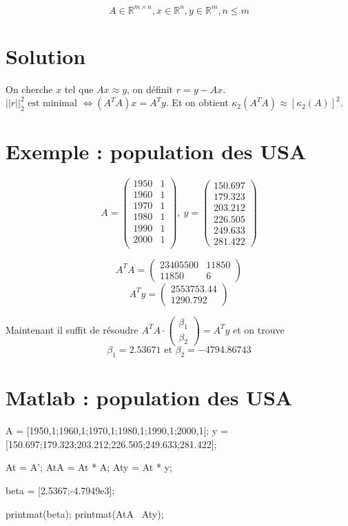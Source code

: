\documentclass[a4paper,9pt]{extarticle}
\newcommand{\matdd}[2]{\begin{pmatrix}#1 \\ #2\end{pmatrix}}
\begin{document}
$$
A \in \mathbb{R}^{m\times n}, x \in \mathbb{R}^n, y \in \mathbb{R}^m, n \leq m
$$

\section{Solution}

On cherche $x$ tel que $Ax \approx y$, on définit $r = y - Ax$. $||r||^2_2 \text{ est minimal } \Longleftrightarrow (A^T A)x = A^T y$. Et on obtient $\kappa_2(A^T A) \approx [\kappa_2(A)]^2$.

\section{Exemple : population des USA}

$$
A = \begin{pmatrix}
1950 & 1 \\
1960 & 1 \\
1970 & 1 \\
1980 & 1 \\
1990 & 1 \\
2000 & 1 \\
\end{pmatrix}, \ 
y = \begin{pmatrix}
150.697 \\
179.323 \\
203.212 \\
226.505 \\
249.633 \\
281.422
\end{pmatrix}
$$

$$
A^T A = \begin{pmatrix}
23405500 & 11850 \\
11850 & 6
\end{pmatrix}
$$
$$
A^T y = \begin{pmatrix}
2553753.44 \\
1290.792
\end{pmatrix}
$$

Maintenant il suffit de résoudre $A^T A \cdot \matdd{\beta_1}{\beta_2} = A^T y$ et on trouve $$\beta_1 = 2.53671 \text{ et } \beta_2 = -4794.86743$$

\section{Matlab : population des USA}
\begin{matlabcode}
A = [1950,1;1960,1;1970,1;1980,1;1990,1;2000,1];
y = [150.697;179.323;203.212;226.505;249.633;281.422];

At = A';
AtA = At * A;
Aty = At * y;

beta = [2.5367;-4.7949e3];

printmat(beta);
printmat(AtA \ Aty);
\end{matlabcode}
\end{document}
